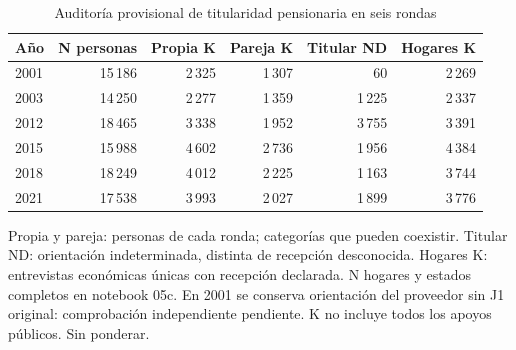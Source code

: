\begin{table}[!htbp]
\centering
\caption{Auditoría provisional de titularidad pensionaria en seis rondas}\label{tab:titularidad-rondas}
\small\setlength{\tabcolsep}{4pt}
\renewcommand{\arraystretch}{1.15}
\begin{tabular}{lrrrrr}
\toprule
\textbf{Año} & \textbf{N personas} & \textbf{Propia K} & \textbf{Pareja K} & \textbf{Titular ND} & \textbf{Hogares K} \\
\midrule
2001 & 15\,186 & 2\,325 & 1\,307 & 60 & 2\,269 \\
2003 & 14\,250 & 2\,277 & 1\,359 & 1\,225 & 2\,337 \\
2012 & 18\,465 & 3\,338 & 1\,952 & 3\,755 & 3\,391 \\
2015 & 15\,988 & 4\,602 & 2\,736 & 1\,956 & 4\,384 \\
2018 & 18\,249 & 4\,012 & 2\,225 & 1\,163 & 3\,744 \\
2021 & 17\,538 & 3\,993 & 2\,027 & 1\,899 & 3\,776 \\
\bottomrule
\end{tabular}
\par\medskip
\parbox{\linewidth}{\footnotesize Propia y pareja: personas de cada ronda; categorías que pueden coexistir. Titular ND: orientación indeterminada, distinta de recepción desconocida. Hogares K: entrevistas económicas únicas con recepción declarada. N hogares y estados completos en notebook 05c. En 2001 se conserva orientación del proveedor sin J1 original: comprobación independiente pendiente. K no incluye todos los apoyos públicos. Sin ponderar.}
\end{table}

